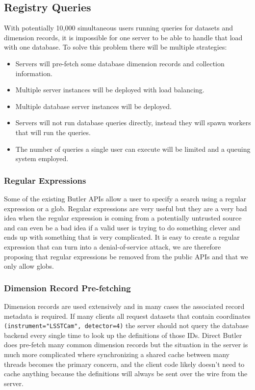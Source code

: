 \subsection{Registry Queries}

With potentially 10,000 simultaneous users running queries for datasets and dimension records, it is impossible for one server to be able to handle that load with one database.
To solve this problem there will be multiple strategies:

\begin{itemize}
\item
  Servers will pre-fetch some database dimension records and collection information. \cite{DMTN-289}
\item
  Multiple server instances will be deployed with load balancing.
\item
  Multiple database server instances will be deployed.
\item
  Servers will not run database queries directly, instead they will spawn workers that will run the queries.
\item
  The number of queries a single user can execute will be limited and a queuing system employed.
\end{itemize}


\subsubsection{Regular Expressions}\label{regular-expressions}

Some of the existing Butler APIs allow a user to specify a search using a regular expression or a glob.
Regular expressions are very useful but they are a very bad idea when the regular expression is coming from a potentially untrusted source and can even be a bad idea if a valid user is trying to do something clever and ends up with something that is very complicated.
It is easy to create a regular expression that can turn into a denial-of-service attack, we are therefore proposing that regular expressions be removed from the public APIs and that we only allow globs.

\subsubsection{Dimension Record Pre-fetching}\label{dimension-record-pre-fetching}

Dimension records are used extensively and in many cases the associated record metadata is required.
If many clients all request datasets that contain coordinates \texttt{(instrument="LSSTCam", detector=4)} the server should not query the database backend every single time to look up the definitions of those IDs.
Direct Butler does pre-fetch many common dimension records but the situation in the server is much more complicated where synchronizing a shared cache between many threads becomes the primary concern, and the client code likely doesn't need to cache anything because the definitions will always be sent over the wire from the server.

